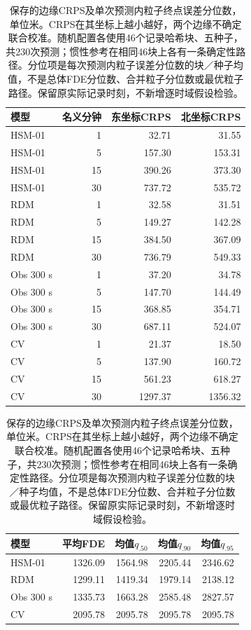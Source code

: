 \begin{table}[htbp]
\centering\small
\caption{保存的边缘CRPS及单次预测内粒子终点误差分位数，单位米。CRPS在其坐标上越小越好，两个边缘不确定联合校准。随机配置各使用46个记录哈希块、五种子，共230次预测；惯性参考在相同46块上各有一条确定性路径。分位项是每次预测内粒子误差分位数的块／种子均值，不是总体FDE分位数、合并粒子分位数或最优粒子路径。保留原实际记录时刻，不新增逐时域假设检验。}
\label{tab:crps-endpoint-diagnostics}
\begin{tabular}{@{}lrrr@{}}
\toprule
模型 & 名义分钟 & 东坐标CRPS & 北坐标CRPS\\
\midrule
HSM-01 & 1 & 32.71 & 31.55\\
HSM-01 & 5 & 157.30 & 153.31\\
HSM-01 & 15 & 390.26 & 373.30\\
HSM-01 & 30 & 737.72 & 535.72\\
RDM & 1 & 32.58 & 31.51\\
RDM & 5 & 149.27 & 142.28\\
RDM & 15 & 384.50 & 367.09\\
RDM & 30 & 736.79 & 549.33\\
Obs 300 s & 1 & 37.20 & 34.78\\
Obs 300 s & 5 & 147.70 & 144.49\\
Obs 300 s & 15 & 368.85 & 354.71\\
Obs 300 s & 30 & 687.11 & 524.07\\
CV & 1 & 21.37 & 18.50\\
CV & 5 & 137.90 & 160.72\\
CV & 15 & 561.23 & 618.27\\
CV & 30 & 1297.37 & 1356.32\\
\bottomrule
\end{tabular}
\par\medskip
\begin{tabular}{@{}lrrrr@{}}
\toprule
模型 & 平均FDE & 均值$q_{.50}$ & 均值$q_{.90}$ & 均值$q_{.95}$\\
\midrule
HSM-01 & 1326.09 & 1564.98 & 2205.44 & 2346.62\\
RDM & 1299.11 & 1419.34 & 1979.14 & 2138.12\\
Obs 300 s & 1335.73 & 1663.28 & 2585.48 & 2827.57\\
CV & 2095.78 & 2095.78 & 2095.78 & 2095.78\\
\bottomrule
\end{tabular}
\end{table}
